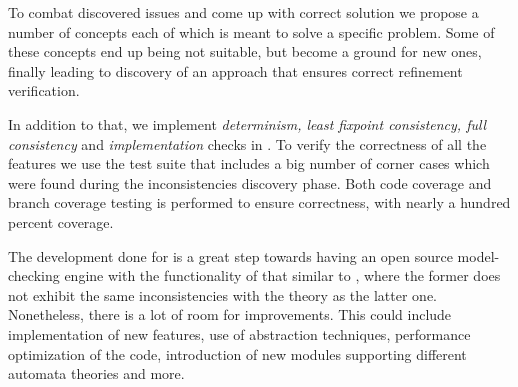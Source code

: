 To combat discovered issues and come up with correct solution we propose a number of concepts each of which is meant to solve a specific problem. Some of these concepts end up being not suitable, but become a ground for new ones, finally leading to discovery of an approach that ensures correct refinement verification. 

In addition to that, we implement \textit{determinism, least fixpoint consistency, full consistency} and \textit{implementation} checks in \jecdar. To verify the correctness of all the features we use the test suite that includes a big number of corner cases which were found during the inconsistencies discovery phase. Both code coverage and branch coverage testing is performed to ensure correctness, with nearly a hundred percent coverage.

The development done for  is a great step towards having an open source model-checking engine with the functionality of that similar to , where the former does not exhibit the same inconsistencies with the theory as the latter one. Nonetheless, there is a lot of room for improvements. This could include implementation of new features, use of abstraction techniques, performance optimization of the code, introduction of new modules supporting different automata theories and more.

\newpage